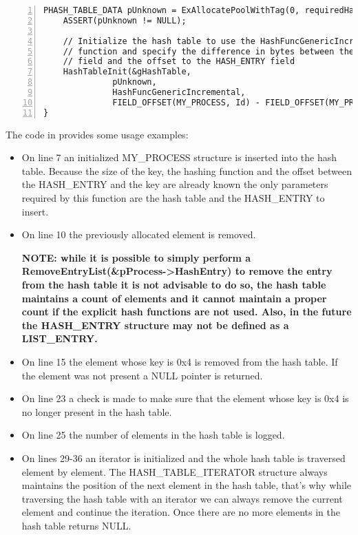 \begin{appendices}
\begin{lstlisting}[caption={Hash Initialization Example},label={lst:HashInitEg},numbers=left]
	PHASH_TABLE_DATA pUnknown = ExAllocatePoolWithTag(0, requiredHashSize, HEAP_TEST_TAG, 0);
	ASSERT(pUnknown != NULL);
	
	// Initialize the hash table to use the HashFuncGenericIncremental hashing
	// function and specify the difference in bytes between the offset to the Key 
	// field and the offset to the HASH_ENTRY field
	HashTableInit(&gHashTable, 
		      pUnknown, 
		      HashFuncGenericIncremental, 
		      FIELD_OFFSET(MY_PROCESS, Id) - FIELD_OFFSET(MY_PROCESS, HashEntry));
}
\end{lstlisting}

The code in  provides some usage examples:
\begin{itemize}
	\item On line 7 an initialized MY\_PROCESS structure is inserted into the hash table. Because
	the size of the key, the hashing function and the offset between the HASH\_ENTRY and the key
	are already known the only parameters required by this function are the hash table and the
	HASH\_ENTRY to insert.
	
	\item On line 10 the previously allocated element is removed. 
	
	\textbf{NOTE: while it is possible
	to simply perform a RemoveEntryList(\&pProcess->HashEntry) to remove the entry from the hash table
	it is not advisable to do so, the hash table maintains a count of elements and it cannot maintain
	a proper count if the explicit hash functions are not used. Also, in the future the HASH\_ENTRY
	structure may not be defined as a LIST\_ENTRY.}
	
	\item On line 15 the element whose key is 0x4 is removed from the hash table. If the element
	was not present a NULL pointer is returned.
	
	\item On line 23 a check is made to make sure that the element whose key is 0x4 is no longer
	present in the hash table.
	
	\item On line 25 the number of elements in the hash table is logged.
	
	\item On lines 29-36 an iterator is initialized and the whole hash table is traversed element by
	element. The HASH\_TABLE\_ITERATOR structure always maintains the position of the next element
	in the hash table, that's why while traversing the hash table with an iterator we can always
	remove the current element and continue the iteration. Once there are no more elements in the
	hash table  returns NULL.
\end{itemize}


\end{appendices}
